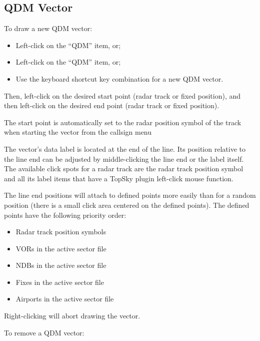 \documentclass[a4paper,oneside,11pt]{memoir}
\begin{document}
\subsection{QDM Vector}
\label{tool:qdm}

To draw a new QDM vector:

\begin{itemize}
    \item Left-click on the “QDM”  item, or;
    \item Left-click on the “QDM”  item, or;
    \item Use the keyboard shortcut key combination for a new QDM vector.
\end{itemize}

Then, left-click on the desired start point (radar track or fixed position), and then left-click on the desired end point (radar track or fixed position).

The start point is automatically set to the radar position symbol of the track when starting the vector from the callsign menu

\bigskip

The vector’s data label is located at the end of the line. Its position relative to the line end can be adjusted by middle-clicking the line end or the label itself. The available click spots for a radar track are the radar track position symbol and all its label items that have a TopSky plugin left-click mouse function.

The line end positions will attach to defined points more easily than for a random position (there is a small click area centered on the defined points). The defined points have the following priority order:

\begin{itemize}
    \item Radar track position symbols
    \item VORs in the active sector file
    \item NDBs in the active sector file
    \item Fixes in the active sector file
    \item Airports in the active sector file
\end{itemize}

\bigskip

Right-clicking will abort drawing the vector.

\bigskip

To remove a QDM vector:
\end{document}
